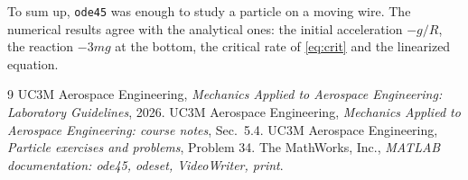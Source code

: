 \documentclass[11pt,a4paper]{article}
\begin{document}
To sum up, \texttt{ode45} was enough to study a particle on a moving  wire. The numerical results agree with the analytical ones: the initial acceleration $-g/R$, the reaction $-3mg$ at the bottom, the critical rate of \cref{eq:crit} and the linearized equation.

{\footnotesize
\begin{thebibliography}{9}
  \setlength{\itemsep}{0pt}
  UC3M Aerospace Engineering, \emph{Mechanics Applied to Aerospace Engineering: Laboratory Guidelines}, 2026.
  UC3M Aerospace Engineering, \emph{Mechanics Applied to Aerospace Engineering: course notes}, Sec.~5.4.
  UC3M Aerospace Engineering, \emph{Particle exercises and problems}, Problem 34.
  The MathWorks, Inc., \emph{MATLAB documentation: ode45, odeset, VideoWriter, print}.
\end{thebibliography}}
\end{document}
